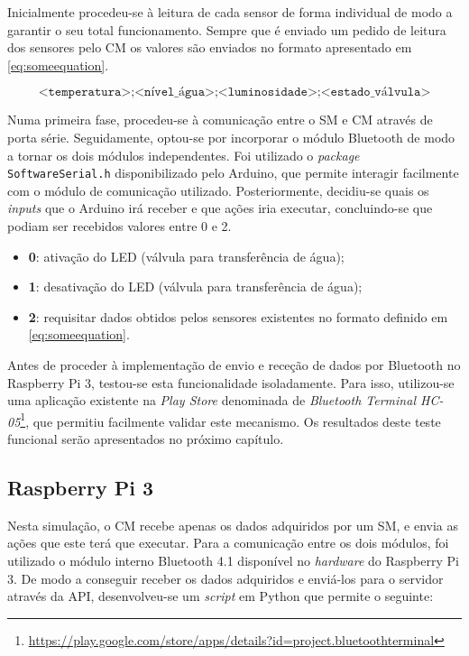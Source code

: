 Inicialmente procedeu-se à leitura de cada sensor de forma individual de modo a garantir o seu total funcionamento. Sempre que é enviado um pedido de leitura dos sensores pelo \acl{CM} os valores são enviados no formato apresentado em \ref{eq:someequation}.

\begin{equation} 
\label{eq:someequation}
\texttt{<temperatura>;<nível\_água>;<luminosidade>;<estado\_válvula>}
\end{equation}



Numa primeira fase, procedeu-se à comunicação entre o \acl{SM} e \acl{CM} através de porta série. Seguidamente, optou-se por incorporar o módulo Bluetooth de modo a tornar os dois módulos independentes. Foi utilizado o  \textit{package} \texttt{SoftwareSerial.h} disponibilizado pelo Arduino, que permite interagir facilmente com o módulo de comunicação utilizado. Posteriormente, decidiu-se quais os \textit{inputs} que o Arduino irá receber e que ações iria executar, concluindo-se que podiam ser recebidos valores entre 0 e 2. 


\begin{itemize}
	\item \textbf{0}: ativação do \ac{LED} (válvula para transferência de água); 
	\item \textbf{1}: desativação do \ac{LED} (válvula para transferência de água); 
	\item \textbf{2}: requisitar dados obtidos pelos sensores existentes no formato definido em \ref{eq:someequation}. 
\end{itemize}

Antes de proceder à implementação de envio e receção de dados por Bluetooth no Raspberry Pi 3, testou-se esta funcionalidade isoladamente. Para isso, utilizou-se uma aplicação existente na \textit{Play Store} denominada  de \textit{Bluetooth Terminal HC-05}\footnote{\url{https://play.google.com/store/apps/details?id=project.bluetoothterminal}}, que permitiu facilmente validar este mecanismo. Os resultados deste teste funcional serão apresentados no próximo capítulo. 



\subsection{Raspberry Pi 3}

Nesta simulação, o \acl{CM} recebe apenas os dados adquiridos por um \acl{SM}, e envia as ações que este terá que executar.  Para a comunicação entre os dois módulos, foi utilizado o módulo interno Bluetooth 4.1 disponível no \textit{hardware} do Raspberry Pi 3. De modo a conseguir receber os dados adquiridos e enviá-los para o servidor através da \ac{API}, desenvolveu-se um \textit{script} em Python que permite o seguinte: 


